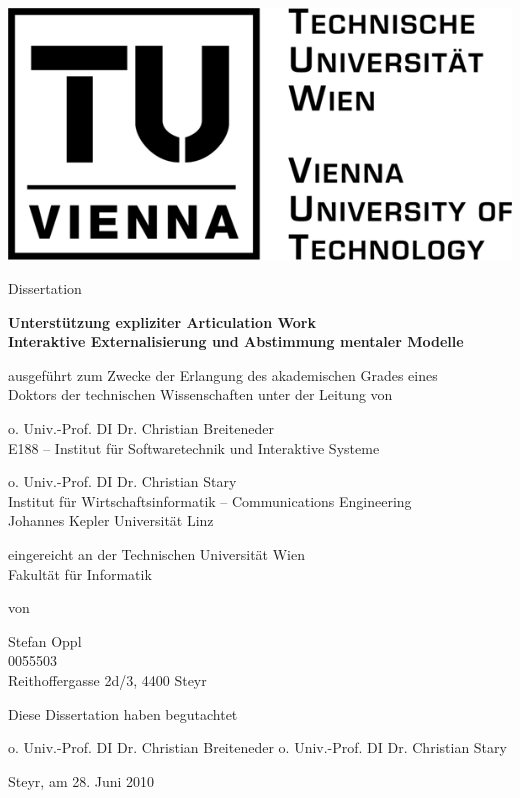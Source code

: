 \begin{titlepage}
	{
	\centering

	\includegraphics[width=.25\textwidth]{img/tu_logo.png}

	\vspace{1cm}

	\Large Dissertation
	
	\vspace{0.5cm}
	
	\textsf{
	\Large \textbf{Unterstützung expliziter Articulation Work}\\	
	\large \textbf{Interaktive Externalisierung und Abstimmung mentaler Modelle}
	}

	\vspace{1cm}
	
	\normalsize ausgeführt zum Zwecke der Erlangung des akademischen Grades eines\\Doktors der technischen Wissenschaften unter der Leitung von

	\vspace{0.2cm}
	
	o. Univ.-Prof. DI Dr. Christian Breiteneder\\\small E188 -- Institut für Softwaretechnik und Interaktive Systeme

	\vspace{0.2cm}

	\normalsize o. Univ.-Prof. DI Dr. Christian Stary\\\small Institut für Wirtschaftsinformatik -- Communications Engineering\\Johannes Kepler Universität Linz

	\vspace{0.4cm}

	\normalsize eingereicht an der Technischen Universität Wien\\Fakultät für Informatik

	\vspace{0.5cm}

	von

	\vspace{0.2cm}

	Stefan Oppl\\\small 0055503\\Reithoffergasse 2d/3, 4400 Steyr
	
	\vspace{0.8cm}
	
	\normalsize Diese Dissertation haben begutachtet
	
	\vspace{1cm}
	\small o. Univ.-Prof. DI Dr. Christian Breiteneder \hspace{1cm} o. Univ.-Prof. DI Dr. Christian Stary

	\vspace{1.3cm}
	}
	\normalsize Steyr, am 28. Juni 2010
	
\end{titlepage}